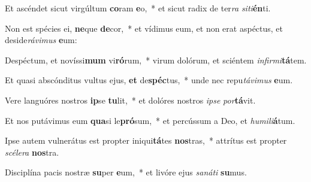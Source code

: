 \item Et ascéndet sicut virgúltum \textbf{co}ram \textbf{e}o,~* et sicut radix de ter\textit{ra} \textit{si}\textit{ti}\textbf{én}ti.
\item Non est spécies ei, \textbf{ne}que \textbf{de}cor,~* et vídimus eum, et non erat aspéctus, et deside\textit{rá}\textit{vi}\textit{mus} \textbf{e}um:
\item Despéctum, et novíssi\textbf{mum} vi\textbf{ró}rum,~* virum dolórum, et sciéntem \textit{in}\textit{fir}\textit{mi}\textbf{tá}tem.
\item Et quasi abscónditus vultus ejus, \textbf{et} de\textbf{spéc}tus,~* unde nec repu\textit{tá}\textit{vi}\textit{mus} \textbf{e}um.
\item Vere languóres nostros \textbf{ip}se \textbf{tu}lit,~* et dolóres nostros \textit{ip}\textit{se} \textit{por}\textbf{tá}vit.
\item Et nos putávimus eum \textbf{qua}si le\textbf{pró}sum,~* et percússum a Deo, et \textit{hu}\textit{mi}\textit{li}\textbf{á}tum.
\item Ipse autem vulnerátus est propter iniqui\textbf{tá}tes \textbf{nos}tras,~* attrítus est propter \textit{scé}\textit{le}\textit{ra} \textbf{nos}tra.
\item Disciplína pacis nostræ \textbf{su}per \textbf{e}um,~* et livóre ejus \textit{sa}\textit{ná}\textit{ti} \textbf{su}mus.
